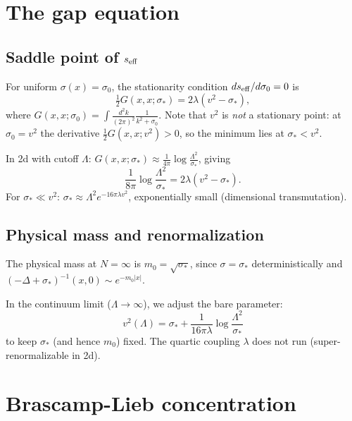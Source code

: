 \documentclass[12pt]{article}
\theoremstyle{definition}
\theoremstyle{remark}
\begin{document}
\section{The gap equation}

\subsection{Saddle point of $s_{\rm eff}$}

For uniform $\sigma(x) = \sigma_0$, the stationarity condition
$ds_{\rm eff}/d\sigma_0 = 0$ is
\begin{equation}
\label{eq:gap}
  \tfrac{1}{2}G(x,x;\sigma_*)
    = 2\lambda(v^2 - \sigma_*),
\end{equation}
where $G(x,x;\sigma_0) = \int\frac{d^2k}{(2\pi)^2}\frac{1}{k^2+\sigma_0}$.
Note that $v^2$ is \emph{not} a stationary point: at $\sigma_0 = v^2$
the derivative $\tfrac{1}{2}G(x,x;v^2) > 0$, so the minimum lies
at $\sigma_* < v^2$.

In 2d with cutoff $\Lambda$:
$G(x,x;\sigma_*) \approx \frac{1}{4\pi}\log\frac{\Lambda^2}{\sigma_*}$,
giving
\begin{equation}
\label{eq:gap_explicit}
  \frac{1}{8\pi}\log\frac{\Lambda^2}{\sigma_*}
    = 2\lambda(v^2-\sigma_*).
\end{equation}
For $\sigma_*\ll v^2$:
$\sigma_* \approx \Lambda^2 e^{-16\pi\lambda v^2}$,
exponentially small (dimensional transmutation).

\subsection{Physical mass and renormalization}

The physical mass at $N=\infty$ is $m_0 = \sqrt{\sigma_*}$, since
$\sigma = \sigma_*$ deterministically and
$(-\Delta+\sigma_*)^{-1}(x,0) \sim e^{-m_0|x|}$.

In the continuum limit ($\Lambda \to \infty$), we adjust the bare
parameter:
\begin{equation}
  v^2(\Lambda) = \sigma_* + \frac{1}{16\pi\lambda}\log\frac{\Lambda^2}{\sigma_*}
\end{equation}
to keep $\sigma_*$ (and hence $m_0$) fixed. The quartic coupling
$\lambda$ does not run (super-renormalizable in 2d).

\section{Brascamp-Lieb concentration}
\end{document}
